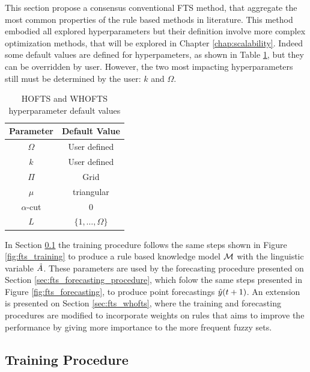This section propose a consensus conventional FTS method, that aggregate the most common properties of the rule based methods in literature. This method embodied all explored hyperparameters but their definition involve more complex optimization methods, that will be explored in Chapter \ref{chap:scalability}. Indeed some default values are defined for hyperpameters, as shown in Table \ref{tab:hofts_hyperparam}, but they can be overridden by user. However, the two most impacting hyperparameters still must be determined by the user: $k$ and $\Omega$.

\begin{table}[htb] 
    \centering
    \begin{tabular}{|c|c|} \hline
        \textbf{Parameter} & \textbf{Default Value}  \\ \hline
        $\Omega$ & User defined  \\ \hline
        $k$ & User defined  \\ \hline
        $\Pi$ & Grid \\ \hline
        $\mu$ & triangular  \\ \hline 
        $\alpha$-cut & 0 \\ \hline
        $L$ & $\{1,\ldots,\Omega\}$  \\ \hline
    \end{tabular}
    \caption{HOFTS and WHOFTS hyperparameter default values}
    \label{tab:hofts_hyperparam}
\end{table}

In Section \ref{sec:fts_training_procedure} the training procedure follows the same steps shown in Figure \ref{fig:fts_training} to produce a rule based knowledge model $\mathcal{M}$ with the linguistic variable $\tilde{A}$. These parameters are used by the forecasting procedure presented on Section \ref{sec:fts_forecasting_procedure}, which folow the same steps presented in Figure \ref{fig:fts_forecasting}, to produce point forecastings $\hat{y}(t+1)$. An extension is presented on Section \ref{sec:fts_whofts}, where the training and forecasting procedures are modified to incorporate weights on rules that aims to improve the performance by giving more importance to the more frequent fuzzy sets. 

%
\subsection{Training Procedure}
\label{sec:fts_training_procedure}

